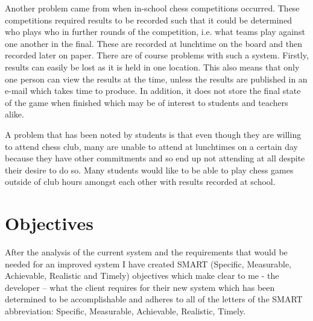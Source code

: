 \documentclass[]{report}
\begin{document}
Another problem came from when in-school chess competitions occurred. These competitions required results to be recorded such that it could be determined who plays who in further rounds of the competition, i.e. what teams play against one another in the final. These are recorded at lunchtime on the board and then recorded later on paper. There are of course problems with such a system. Firstly, results can easily be lost as it is held in one location. This also means that only one person can view the results at the time, unless the results are published in an e-mail which takes time to produce. In addition, it does not store the final state of the game when finished which may be of interest to students and teachers alike.

A problem that has been noted by students is that even though they are willing to attend chess club, many are unable to attend at lunchtimes on a certain day because they have other commitments and so end up not attending at all despite their desire to do so. Many students would like to be able to play chess games outside of club hours amongst each other with results recorded at school.
\section{Objectives}
After the analysis of the current system and the requirements that would be needed for an improved system I have created SMART (Specific, Measurable, Achievable, Realistic and Timely) objectives which make clear to me - the developer – what the client requires for their new system which has been determined to be accomplishable and adheres to all of the letters of the SMART abbreviation: Specific, Measurable, Achievable, Realistic, Timely.
\end{document}
